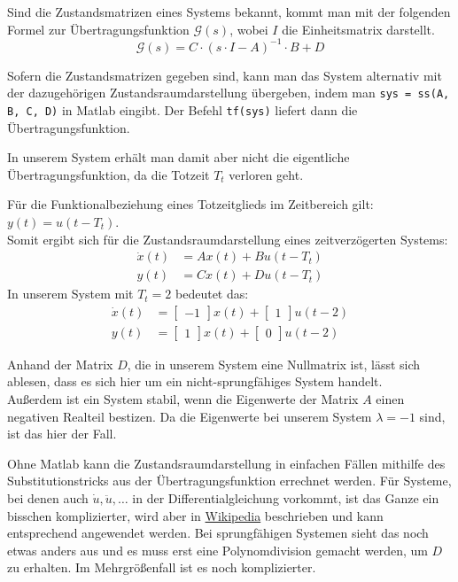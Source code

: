 Sind die Zustandsmatrizen eines Systems bekannt, kommt man mit der folgenden Formel zur Übertragungsfunktion $\mathcal{G}(s)$, wobei $I$ die Einheitsmatrix darstellt.
\[
    \mathcal{G}(s) = C\cdot (s \cdot I - A)^{-1} \cdot B + D
\]

Sofern die Zustandsmatrizen gegeben sind, kann man das System alternativ mit der dazugehörigen Zustandsraumdarstellung übergeben, indem man \texttt{sys = ss(A, B, C, D)} in Matlab eingibt. Der Befehl \texttt{tf(sys)} liefert dann die Übertragungsfunktion.

In unserem System erhält man damit aber nicht die eigentliche Übertragungsfunktion, da die Totzeit $T_t$ verloren geht.

Für die Funktionalbeziehung eines Totzeitglieds im Zeitbereich gilt: $y(t) = u(t-T_t)$. \\
Somit ergibt sich für die Zustandsraumdarstellung eines zeitverzögerten Systems:
\begin{align*}
    \dot x(t) & = Ax(t) + Bu(t - T_t) \nonumber \\
    y(t) & = Cx(t) + Du(t - T_t)
\end{align*}
In unserem System mit $T_t = 2$ bedeutet das:
\begin{align*}
    \dot x(t) & = \begin{bmatrix}
        -1
    \end{bmatrix}x(t) + \begin{bmatrix}
        1
    \end{bmatrix}u(t - 2) \nonumber \\
    y(t) & = \begin{bmatrix}
        1
    \end{bmatrix}x(t) + \begin{bmatrix}
        0
    \end{bmatrix}u(t - 2)
\end{align*}

Anhand der Matrix $D$, die in unserem System eine Nullmatrix ist, lässt sich ablesen, dass es sich hier um ein nicht-sprungfähiges System handelt.\\ 
Außerdem ist ein System stabil, wenn die Eigenwerte der Matrix $A$ einen negativen Realteil bestizen. Da die Eigenwerte bei unserem System $\lambda = -1$ sind, ist das hier der Fall.

Ohne Matlab kann die Zustandsraumdarstellung in einfachen Fällen mithilfe des Substitutionstricks aus der Übertragungsfunktion errechnet werden. Für Systeme, bei denen auch $\dot u, \ddot u, \ldots$ in der Differentialgleichung vorkommt, ist das Ganze ein bisschen komplizierter, wird aber in \href{https://de.wikipedia.org/wiki/Zustandsraumdarstellung#Regelungsnormalform}{Wikipedia} beschrieben und kann entsprechend angewendet werden. Bei sprungfähigen Systemen sieht das noch etwas anders aus und es muss erst eine Polynomdivision gemacht werden, um $D$ zu erhalten. Im Mehrgrößenfall ist es noch komplizierter.

